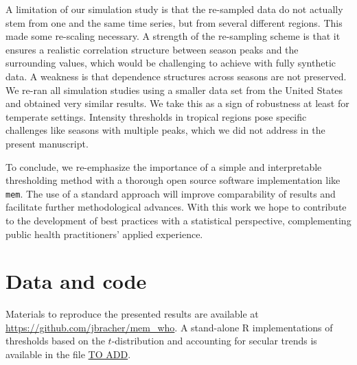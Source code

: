 \documentclass[12pt]{article}
\begin{document}
A limitation of our simulation study is that the re-sampled data do not actually stem from one and the same time series, but from several different regions. This made some re-scaling necessary. A strength of the re-sampling scheme is that it ensures a realistic correlation structure between season peaks and the surrounding values, which would be challenging to achieve with fully synthetic data. A weakness is that dependence structures across seasons are not preserved. We re-ran all simulation studies using a smaller data set from the United States and obtained very similar results. We take this as a sign of robustness at least for temperate settings. Intensity thresholds in tropical regions pose specific challenges like seasons with multiple peaks, which we did not address in the present manuscript.





To conclude, we re-emphasize the importance of a simple and interpretable thresholding method with a thorough open source software implementation like \texttt{mem}. The use of a standard approach will improve comparability of results and facilitate further methodological advances. With this work we hope to contribute to the development of best practices  with a statistical perspective, complementing public health practitioners' applied experience.


\section*{Data and code}

Materials to reproduce the presented results are available at \url{https://github.com/jbracher/mem_who}. A stand-alone R implementations of thresholds based on the $t$-distribution and accounting for secular trends is available in the file \url{TO ADD}. 
\end{document}
